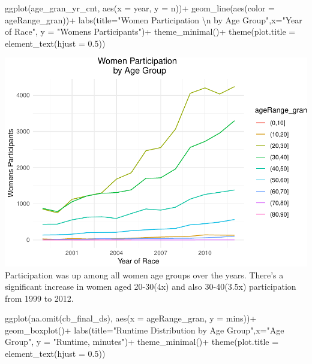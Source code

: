 \documentclass[
]{article}
\newenvironment{Shaded}{\begin{snugshade}}{\end{snugshade}}
\newcommand{\AttributeTok}[1]{\textcolor[rgb]{0.77,0.63,0.00}{#1}}
\newcommand{\FloatTok}[1]{\textcolor[rgb]{0.00,0.00,0.81}{#1}}
\newcommand{\FunctionTok}[1]{\textcolor[rgb]{0.00,0.00,0.00}{#1}}
\newcommand{\NormalTok}[1]{#1}
\newcommand{\SpecialCharTok}[1]{\textcolor[rgb]{0.00,0.00,0.00}{#1}}
\newcommand{\StringTok}[1]{\textcolor[rgb]{0.31,0.60,0.02}{#1}}
\begin{document}
\begin{Shaded}
\begin{Highlighting}[]
\FunctionTok{ggplot}\NormalTok{(age\_gran\_yr\_cnt, }\FunctionTok{aes}\NormalTok{(}\AttributeTok{x =}\NormalTok{ year, }\AttributeTok{y =}\NormalTok{ n))}\SpecialCharTok{+}
  \FunctionTok{geom\_line}\NormalTok{(}\FunctionTok{aes}\NormalTok{(}\AttributeTok{color =}\NormalTok{ ageRange\_gran))}\SpecialCharTok{+}
  \FunctionTok{labs}\NormalTok{(}\AttributeTok{title=}\StringTok{"Women Participation }\SpecialCharTok{\textbackslash{}n}\StringTok{ by Age Group"}\NormalTok{,}\AttributeTok{x=}\StringTok{"Year of Race"}\NormalTok{, }\AttributeTok{y =} \StringTok{"Womens Participants"}\NormalTok{)}\SpecialCharTok{+}
  \FunctionTok{theme\_minimal}\NormalTok{()}\SpecialCharTok{+}
  \FunctionTok{theme}\NormalTok{(}\AttributeTok{plot.title =} \FunctionTok{element\_text}\NormalTok{(}\AttributeTok{hjust =} \FloatTok{0.5}\NormalTok{))}
\end{Highlighting}
\end{Shaded}

\includegraphics{case_study02_SO02_files/figure-latex/analysis9-1}
Participation was up among all women age groups over the years. There's
a significant increase in women aged 20-30(4x) and also 30-40(3.5x)
participation from 1999 to 2012.

\begin{Shaded}
\begin{Highlighting}[]
\FunctionTok{ggplot}\NormalTok{(}\FunctionTok{na.omit}\NormalTok{(cb\_final\_ds), }\FunctionTok{aes}\NormalTok{(}\AttributeTok{x =}\NormalTok{ ageRange\_gran, }\AttributeTok{y =}\NormalTok{ mins))}\SpecialCharTok{+}
  \FunctionTok{geom\_boxplot}\NormalTok{()}\SpecialCharTok{+}
  \FunctionTok{labs}\NormalTok{(}\AttributeTok{title=}\StringTok{"Runtime Distribution by Age Group"}\NormalTok{,}\AttributeTok{x=}\StringTok{"Age Group"}\NormalTok{, }\AttributeTok{y =} \StringTok{"Runtime, minutes"}\NormalTok{)}\SpecialCharTok{+}
  \FunctionTok{theme\_minimal}\NormalTok{()}\SpecialCharTok{+}
  \FunctionTok{theme}\NormalTok{(}\AttributeTok{plot.title =} \FunctionTok{element\_text}\NormalTok{(}\AttributeTok{hjust =} \FloatTok{0.5}\NormalTok{))}
\end{Highlighting}
\end{Shaded}
\end{document}
